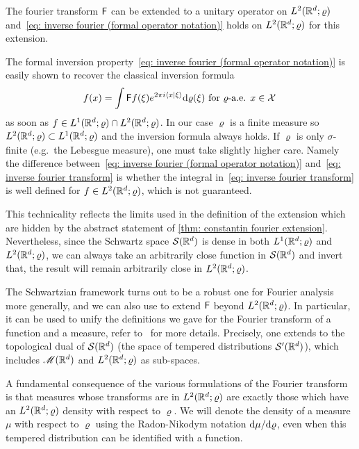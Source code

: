 \begin{theorem}\label{thm: constantin fourier extension}
    The fourier transform $\mathsf{F}$ can be extended to a unitary operator on $L^2(\mathbb{R}^d;\varrho)$ and~\eqref{eq: inverse fourier (formal operator notation)} holds on $L^2(\mathbb{R}^d;\varrho)$ for this extension.
\end{theorem}

The formal inversion property~\eqref{eq: inverse fourier (formal operator notation)} is easily shown to recover the classical inversion formula 
\begin{align}
    f(x)=\int \mathsf{F} f(\xi)e^{2\pi i\langle x\vert \xi\rangle}\mathrm{d}\varrho(\xi) \mbox{ for $\varrho$-a.e. }x\in\mathcal{X}\, \label{eq: inverse fourier transform}
\end{align}
as soon as $f\in L^1(\mathbb{R}^d;\varrho)\cap L^2(\mathbb{R}^d;\varrho)$. In our case $\varrho$ is a finite measure so $L^2(\mathbb{R}^d;\varrho)\subset L^1(\mathbb{R}^d;\varrho)$ and the inversion formula always holds. If $\varrho$ is only $\sigma$-finite (e.g.\ the Lebesgue measure), one must take slightly higher care. Namely 
the difference between~\eqref{eq: inverse fourier (formal operator notation)} and~\eqref{eq: inverse fourier transform} is whether the integral in~\eqref{eq: inverse fourier transform} is well defined for $f\in L^2(\mathbb{R}^d;\varrho)$, which is not guaranteed. 

This technicality reflects the limits used in the definition of the extension which are hidden by the abstract statement of \cref{thm: constantin fourier extension}. Nevertheless, since the Schwartz space $\mathcal{S}(\mathbb{R}^d)$ is dense in both $L^1(\mathbb{R}^d;\varrho)$ and $L^2(\mathbb{R}^d;\varrho)$, we can always take an arbitrarily close function in $\mathcal{S}(\mathbb{R}^d)$ and invert that, the result will remain arbitrarily close in $L^2(\mathbb{R}^d;\varrho)$.


The Schwartzian framework turns out to be a robust one for Fourier analysis more generally, and we can also use to extend $\mathsf{F}$ beyond $L^2(\mathbb{R}^d;\varrho)$. In particular, it can be used to unify the definitions we gave for the Fourier transform of a function and a measure, refer to~\cite[\S~6.1.2]{constantin_fourier_2016} for more details. Precisely, one extends to the topological dual of $\mathcal{S}(\mathbb{R}^d)$ (the space of tempered distributions $\mathcal{S}'(\mathbb{R}^d)$), which includes $\mathscr{M}(\mathbb{R}^d)$ and $L^2(\mathbb{R}^d;\varrho)$ as sub-spaces.


A fundamental consequence of the various formulations of the  Fourier transform is that measures whose transforms are in $L^2(\mathbb{R}^d;\varrho)$ are exactly those which have an $L^2(\mathbb{R}^d;\varrho)$ density with respect to $\varrho$. We will denote the density of a measure $\mu$ with respect to $\varrho$ using the Radon-Nikodym notation $\mathrm{d}\mu/\mathrm{d}\varrho$, even when this tempered distribution can be identified with a function.

